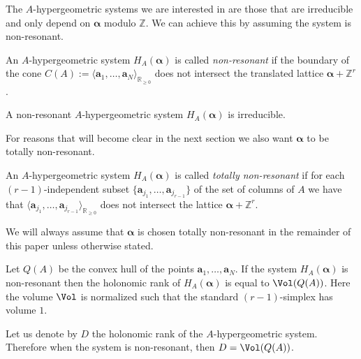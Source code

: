The $A$-hypergeometric systems we are interested in are those that are irreducible and only depend on $\bm{\alpha}$ modulo $\mathbb{Z}$. We can achieve this by assuming the system is non-resonant.

\begin{Definition}
An $A$-hypergeometric system $H_{A}(\bm{\alpha})$ is called {\it non-resonant} if the boundary of the cone $C(A) := \langle \bm{a}_1, \dots,\bm{a}_N \rangle_{\mathbb{R}_{\geq 0}}$ does not intersect the translated lattice $\bm{\alpha} + \mathbb{Z}^r$.
\end{Definition}

\begin{Theorem}
A non-resonant {$A$-hypergeometric} system $H_A(\bm\alpha)$ is irreducible.
\end{Theorem}

For reasons that will become clear in the next section we also want $\bm{\alpha}$ to be totally non-resonant.

\begin{Definition}\label{def:total-nonres}\sloppy
An $A$-hypergeometric system $H_{A}(\bm{\alpha})$ is called {\it totally non-resonant} if for each \mbox{$(r-1)$}-independent subset $\{\bm{a}_{j_1},\dots,\bm{a}_{j_{r-1}}\}$ of the set of columns of $A$ we have that $\langle \bm{a}_{j_1}, \dots,\bm{a}_{j_{r-1}} \rangle_{\mathbb{R}_{\geq 0}}$ does not intersect the lattice $\bm{\alpha} + \mathbb{Z}^r$.
\end{Definition}

We will always assume that $\bm{\alpha}$ is chosen totally non-resonant in the remainder of this paper unless otherwise stated.

\begin{Theorem}\label{thm:A-rank}
Let $Q(A)$ be the convex hull of the points $\bm{a}_1,\dots,\bm{a}_N$. If the system $H_{A}(\bm{\alpha})$ is non-resonant then the holonomic rank of $H_{A}(\bm{\alpha})$ is equal to $\Vol(Q(A))$. Here the volume $\Vol$ is normalized such that the standard $(r-1)$-simplex has volume $1$.
\end{Theorem}
Let us denote by $D$ the holonomic rank of the $A$-hypergeometric system. Therefore when the system is non-resonant, then $D = \Vol(Q(A))$.


